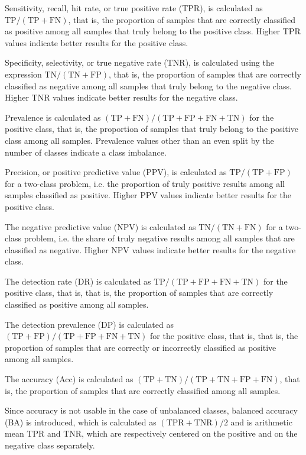 \documentclass[preprint,12pt]{elsarticle}
\begin{document}
Sensitivity, recall, hit rate, or true positive rate (TPR), is calculated as $\mathrm{TP}/(\mathrm{TP}+\mathrm{FN})$, that is, the proportion of samples that are correctly classified as positive among all samples that truly belong to the positive class. Higher TPR values indicate better results for the positive class.

Specificity, selectivity, or true negative rate (TNR), is calculated using the expression $\mathrm{TN}/(\mathrm{TN}+\mathrm{FP})$, that is, the proportion of samples that are correctly classified as negative among all samples that truly belong to the negative class. Higher TNR values indicate better results for the negative class.

Prevalence is calculated as $(\mathrm{TP}+\mathrm{FN})/(\mathrm{TP}+\mathrm{FP}+\mathrm{FN}+\mathrm{TN})$ for the positive class, that is, the proportion of samples that truly belong to the positive class among all samples. Prevalence values other than an even split by the number of classes indicate a class imbalance.

Precision, or positive predictive value (PPV), is calculated as $\mathrm{TP}/(\mathrm{TP}+\mathrm{FP})$ for a two-class problem, i.e. the proportion of truly positive results among all samples classified as positive. 
Higher PPV values indicate better results for the positive class.

The negative predictive value (NPV) is calculated as $\mathrm{TN}/(\mathrm{TN}+\mathrm{FN})$ for a two-class problem, i.e. the share of truly negative results among all samples that are classified as negative. Higher NPV values indicate better results for the negative class.

The detection rate (DR) is calculated as $\mathrm{TP}/(\mathrm{TP}+\mathrm{FP}+\mathrm{FN}+\mathrm{TN})$ for the positive class, that is, that is, the proportion of samples that are correctly classified as positive among all samples.

The detection prevalence (DP) is calculated as $(\mathrm{TP}+\mathrm{FP})/(\mathrm{TP}+\mathrm{FP}+\mathrm{FN}+\mathrm{TN})$ for the positive class, that is, that is, the proportion of samples that are correctly or incorrectly classified as positive among all samples.

The accuracy (Acc) is calculated as $(\mathrm{TP} + \mathrm{TN}) / (\mathrm{TP} + \mathrm{TN} + \mathrm{FP} + \mathrm{FN})$, that is, the proportion of samples that are correctly classified among all samples.

Since accuracy is not usable in the case of unbalanced classes, balanced accuracy (BA) is introduced, which is calculated as $(\mathrm{TPR} + \mathrm{TNR}) / 2$ and is arithmetic mean TPR and TNR, which are respectively centered on the positive and on the negative class separately.
\end{document}
